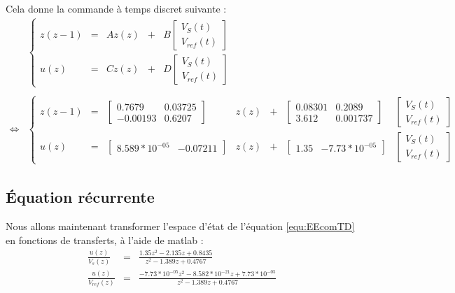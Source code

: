 Cela donne la commande à temps discret suivante :
\begin{equation}
\label{equ:EEcomTD}
\begin{array}{rl}
& \left\lbrace
\begin{array}{rclcl}
z(z-1) 	&=& A z(z) &+& B \begin{bmatrix} V_S(t) \\ V_{ref}(t)  \end{bmatrix}  \\
u(z)  	&=& C z(z) &+& D \begin{bmatrix} V_S(t) \\ V_{ref}(t)  \end{bmatrix}  
\end{array}
\right.\\
&\\
\Leftrightarrow &
\left\lbrace
\begin{array}{rclcclc}
z(z-1) 	&=& 
\begin{bmatrix}
0.7679 		&  0.03725\\
-0.00193   	& 0.6207
\end{bmatrix} &z(z) 
&+& \begin{bmatrix}
0.08301  &  0.2089\\
3.612  	 &	0.001737
\end{bmatrix} 
&\begin{bmatrix} V_S(t) \\ V_{ref}(t)  \end{bmatrix}  \\
u(z)  	&=& \begin{bmatrix}
8.589*10^{-05}  &  -0.07211
\end{bmatrix} &z(z) &+& \begin{bmatrix}
1.35  & -7.73*10^{-05}
\end{bmatrix} 
&\begin{bmatrix} V_S(t) \\ V_{ref}(t)  \end{bmatrix}  
\end{array}
\right.
\end{array}
\end{equation}
	\subsection{Équation récurrente}
	Nous allons maintenant transformer l'espace d'état de l'équation \ref{equ:EEcomTD} en fonctions de transferts, à l'aide de matlab :
\begin{eqnarray}
\frac{u(z)}{V_s(z)} &=& \frac{1.35 z^2 - 2.135 z + 0.8435}{    z^2 - 1.389 z + 0.4767}\\
\frac{u(z)}{V_{ref}(z)}	&=&	\frac{-7.73*10^{-05} z^2 - 8.582*10^{-21} z + 7.73*10^{-05}}{z^2 - 1.389 z + 0.4767}
\end{eqnarray}


